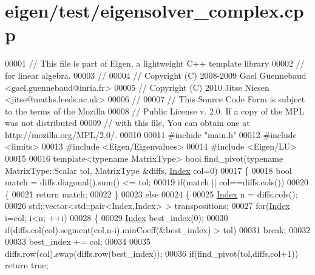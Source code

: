 \hypertarget{eigen_2test_2eigensolver__complex_8cpp_source}{}\section{eigen/test/eigensolver\+\_\+complex.cpp}
\label{eigen_2test_2eigensolver__complex_8cpp_source}

\begin{DoxyCode}
00001 \textcolor{comment}{// This file is part of Eigen, a lightweight C++ template library}
00002 \textcolor{comment}{// for linear algebra.}
00003 \textcolor{comment}{//}
00004 \textcolor{comment}{// Copyright (C) 2008-2009 Gael Guennebaud <gael.guennebaud@inria.fr>}
00005 \textcolor{comment}{// Copyright (C) 2010 Jitse Niesen <jitse@maths.leeds.ac.uk>}
00006 \textcolor{comment}{//}
00007 \textcolor{comment}{// This Source Code Form is subject to the terms of the Mozilla}
00008 \textcolor{comment}{// Public License v. 2.0. If a copy of the MPL was not distributed}
00009 \textcolor{comment}{// with this file, You can obtain one at http://mozilla.org/MPL/2.0/.}
00010 
00011 \textcolor{preprocessor}{#include "main.h"}
00012 \textcolor{preprocessor}{#include <limits>}
00013 \textcolor{preprocessor}{#include <Eigen/Eigenvalues>}
00014 \textcolor{preprocessor}{#include <Eigen/LU>}
00015 
00016 \textcolor{keyword}{template}<\textcolor{keyword}{typename} MatrixType> \textcolor{keywordtype}{bool} find\_pivot(\textcolor{keyword}{typename} MatrixType::Scalar tol, MatrixType &diffs, 
      \hyperlink{namespace_eigen_a62e77e0933482dafde8fe197d9a2cfde}{Index} col=0)
00017 \{
00018   \textcolor{keywordtype}{bool} match = diffs.diagonal().sum() <= tol;
00019   \textcolor{keywordflow}{if}(match || col==diffs.cols())
00020   \{
00021     \textcolor{keywordflow}{return} match;
00022   \}
00023   \textcolor{keywordflow}{else}
00024   \{
00025     \hyperlink{namespace_eigen_a62e77e0933482dafde8fe197d9a2cfde}{Index} n = diffs.cols();
00026     std::vector<std::pair<Index,Index> > transpositions;
00027     \textcolor{keywordflow}{for}(\hyperlink{namespace_eigen_a62e77e0933482dafde8fe197d9a2cfde}{Index} i=col; i<n; ++i)
00028     \{
00029       \hyperlink{namespace_eigen_a62e77e0933482dafde8fe197d9a2cfde}{Index} best\_index(0);
00030       \textcolor{keywordflow}{if}(diffs.col(col).segment(col,n-i).minCoeff(&best\_index) > tol)
00031         \textcolor{keywordflow}{break};
00032       
00033       best\_index += col;
00034       
00035       diffs.row(col).swap(diffs.row(best\_index));
00036       \textcolor{keywordflow}{if}(find\_pivot(tol,diffs,col+1)) \textcolor{keywordflow}{return} \textcolor{keyword}{true};

\end{DoxyCode}
